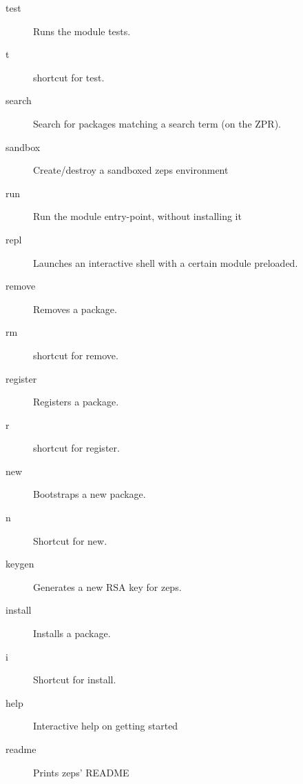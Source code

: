\documentclass[oneside,11pt,xetex]{scrbook}
\begin{document}
\begin{description}
\item [test] Runs the module tests.
\item [t] shortcut for test.
\item [search] Search for packages matching a search term (on the ZPR).
\item [sandbox] Create/destroy a sandboxed zeps environment
\item [run] Run the module entry-point, without installing it
\item [repl] Launches an interactive shell with a certain module preloaded.
\item [remove] Removes a package.
\item [rm] shortcut for remove.
\item [register] Registers a package.
\item [r] shortcut for register.
\item [new] Bootstraps a new package.
\item [n] Shortcut for new.
\item [keygen] Generates a new RSA key for zeps.
\item [install] Installs a package.
\item [i] Shortcut for install.
\item [help] Interactive help on getting started
\item [readme] Prints zeps' README
\end{description}

\backmatter


\printbibliography[title=References,heading=bibintoc]
\end{document}

